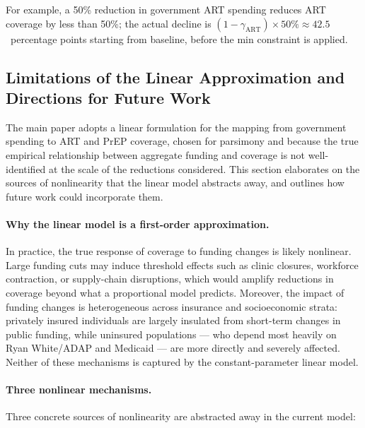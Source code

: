 \documentclass[preprint,12pt]{elsarticle}
\begin{document}
{For example, a 50\% reduction in government ART spending reduces ART coverage by less than
50\%; the actual decline is $(1 - \gamma_{\text{ART}})\times 50\% \approx 42.5$~percentage
points starting from baseline, before the min constraint is applied.

\subsection{Limitations of the Linear Approximation and Directions for Future Work}

The main paper adopts a linear formulation for the mapping from government spending to ART and PrEP coverage, chosen for parsimony and because the true empirical relationship between aggregate funding and coverage is not well-identified at the scale of the reductions considered. This section elaborates on the sources of nonlinearity that the linear model abstracts away, and outlines how future work could incorporate them.

\paragraph{Why the linear model is a first-order approximation.} In practice, the true response of coverage to funding changes is likely nonlinear. Large funding cuts may induce threshold effects such as clinic closures, workforce contraction, or supply-chain disruptions, which would amplify reductions in coverage
beyond what a proportional model predicts. Moreover, the impact of funding changes is heterogeneous across insurance and socioeconomic strata: privately insured individuals are largely insulated from short-term changes in public funding, while uninsured populations --- who depend most heavily on Ryan White/ADAP and Medicaid --- are more directly and severely affected. Neither of these mechanisms is captured by the constant-parameter linear model.

\paragraph{Three nonlinear mechanisms.} Three concrete sources of nonlinearity are abstracted away in the current model:

}
\end{document}
